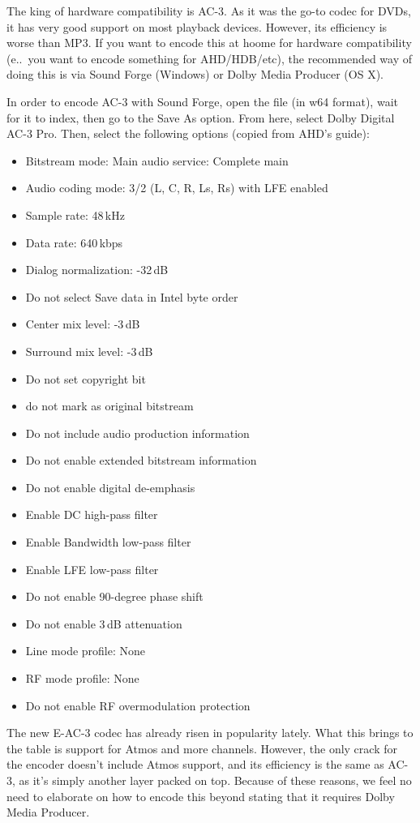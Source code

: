 \documentclass{scrartcl}
\begin{document}
The king of hardware compatibility is AC-3.  As it was the go-to codec for DVDs, it has very good support on most playback devices.  However, its efficiency is worse than MP3.  If you want to encode this at hoome for hardware compatibility (e.\@g.\ you want to encode something for AHD/HDB/etc), the recommended way of doing this is via Sound Forge (Windows) or Dolby Media Producer (OS X).

In order to encode AC-3 with Sound Forge, open the file (in w64 format), wait for it to index, then go to the Save As option.  From here, select Dolby Digital AC-3 Pro.  Then, select the following options (copied from AHD's guide):
\begin{itemize}
\item Bitstream mode: Main audio service: Complete main
\item Audio coding mode: 3/2 (L, C, R, Ls, Rs) with LFE enabled
\item Sample rate: 48\,kHz
\item Data rate: 640\,kbps
\item Dialog normalization: -32\,dB
\item Do not select Save data in Intel byte order
\item Center mix level: -3\,dB
\item Surround mix level: -3\,dB
\item Do not set copyright bit
\item do not mark as original bitstream
\item Do not include audio production information
\item Do not enable extended bitstream information
\item Do not enable digital de-emphasis
\item Enable DC high-pass filter
\item Enable Bandwidth low-pass filter
\item Enable LFE low-pass filter
\item Do not enable 90-degree phase shift
\item Do not enable 3\,dB attenuation
\item Line mode profile: None
\item RF mode profile: None
\item Do not enable RF overmodulation protection
\end{itemize}

The new E-AC-3 codec has already risen in popularity lately.  What this brings to the table is support for Atmos and more channels.  However, the only crack for the encoder doesn't include Atmos support, and its efficiency is the same as AC-3, as it's simply another layer packed on top.  Because of these reasons, we feel no need to elaborate on how to encode this beyond stating that it requires Dolby Media Producer.
\end{document}
